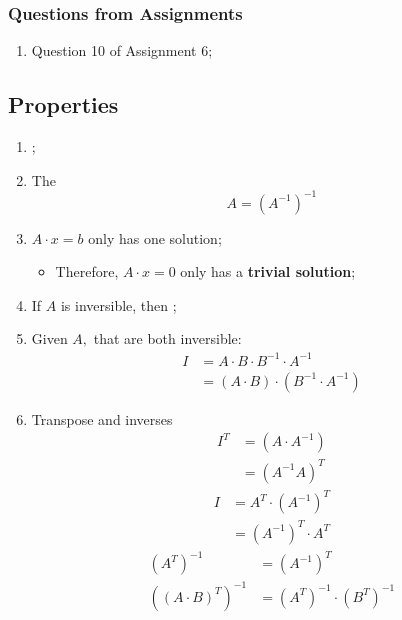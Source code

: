   \subsubsection{Questions from Assignments}
  \begin{enumerate}
    \item Question 10 of Assignment 6;
  \end{enumerate}

\subsection{Properties}
  
  \begin{enumerate}
    \item {};
    
    \item The 
    \begin{displaymath}
      A = \left( A^{-1} \right)^{-1}
    \end{displaymath}
    
    \item $ A \cdot x = b $ only has one solution;
    \begin{itemize}
      \item Therefore, $ A \cdot x = 0 $ only has a \textbf{trivial solution};
    \end{itemize}
    
    \item If $ A $ is inversible, then ;

    \item Given $ A, $ that are both inversible:
    \begin{align*}
      I &= A \cdot B \cdot B^{-1} \cdot A^{-1} \\ 
      &= \left( A \cdot B \right) \cdot \left( B^{-1} \cdot A^{-1} \right)
    \end{align*}
    
    \item Transpose and inverses 
    \begin{align*}
      I^{T} &= \left( A \cdot A^{-1} \right) \\ 
      &= \left( A^{-1} A \right)^{T}
    \end{align*}
    \begin{align*}
      I &= A^{T} \cdot \left( A^{-1} \right)^{T} \\ 
      &= \left( A^{-1} \right)^{T} \cdot A^{T}
    \end{align*}
    \begin{align*}
      \left( A^{T} \right)^{-1} &= \left( A^{-1} \right)^{T} \\ 
      \left( \left( A \cdot B \right)^{T} \right)^{-1} &= 
      \left( A^{T} \right)^{-1} \cdot \left( B^{T} \right)^{-1}
    \end{align*}
    

\end{enumerate}
